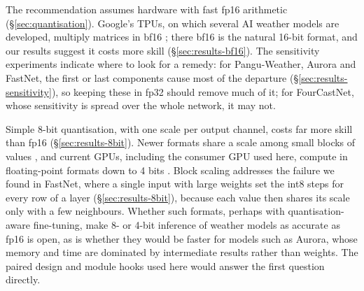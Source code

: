 The recommendation assumes hardware with fast fp16 arithmetic
(\S\ref{sec:quantisation}). Google's TPUs, on which several AI
weather models are developed, multiply matrices in bf16
\citep{wang2019bfloat16}; there bf16 is the natural 16-bit format, and
our results suggest it costs more skill (\S\ref{sec:results-bf16}). The
sensitivity experiments indicate where to look for a remedy: for
Pangu-Weather, Aurora and FastNet, the first or last components cause
most of the departure (\S\ref{sec:results-sensitivity}), so keeping these
in fp32 should remove much of it; for FourCastNet, whose sensitivity is
spread over the whole network, it may not.

Simple 8-bit quantisation, with one scale per output channel,
costs far more skill than fp16 (\S\ref{sec:results-8bit}). Newer formats
share a scale among small blocks of values \citep{rouhani2023microscaling},
and current GPUs, including the consumer GPU used here, compute in
floating-point formats down to 4 bits \citep{nvidia2025rtx50}. Block
scaling addresses the failure we found in FastNet, where a single input
with large weights set the int8 steps for every row of a layer
(\S\ref{sec:results-8bit}), because each value then shares its scale only
with a few neighbours. Whether such formats, perhaps with quantisation-aware
fine-tuning, make 8- or 4-bit inference of weather models as accurate as
fp16 is open, as is whether they would be faster for models such as
Aurora, whose memory and time are dominated by intermediate results
rather than weights. The paired
design and module hooks used here would answer the first question
directly.
